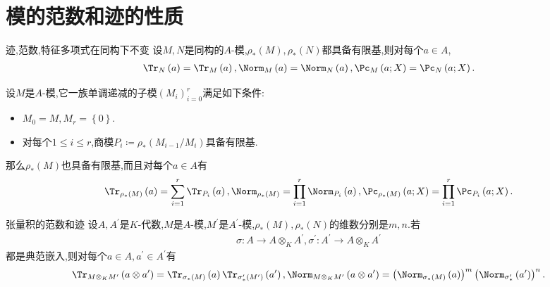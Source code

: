 \section{模的范数和迹的性质}

\begin{proposition}{迹,范数,特征多项式在同构下不变}{}
	设$M,N$是同构的$A$-模,$\rho_{\ast}\left(M\right),\rho_{\ast}\left(N\right)$都具备有限基,则对每个$a\in A$,
	\begin{align*}
		\Tr_{N}\left(a\right)=\Tr_{M}\left(a\right),\Norm_{M}\left(a\right)=\Norm_{N}\left(a\right),\Pc_{M}\left(a;X\right)=\Pc_{N}\left(a;X\right).
	\end{align*}
\end{proposition}

\begin{proposition}{}{}
	设$M$是$A$-模,它一族单调递减的子模$\left(M_{i}\right)_{i=0}^{r}$满足如下条件:
	\begin{itemize}
		\item $M_{0}=M,M_{r}=\left\{0\right\}$.
		\item 对每个$1\leq i\leq r$,商模$P_{i}\coloneq\rho_{\ast}\left(M_{i-1}/M_{i}\right)$具备有限基.
	\end{itemize}
	那么$\rho_{\ast}\left(M\right)$也具备有限基,而且对每个$a\in A$有
	\begin{align*}
		\Tr_{\rho_{\ast}\left(M\right)}\left(a\right)=\sum\limits_{i=1}^{r}\Tr_{P_{i}}\left(a\right),\Norm_{\rho_{\ast}\left(M\right)}=\prod\limits_{i=1}^{r}\Norm_{P_{i}}\left(a\right),\Pc_{\rho_{\ast}\left(M\right)}\left(a;X\right)=\prod\limits_{i=1}^{r}\Pc_{P_{i}}\left(a;X\right).
	\end{align*}
\end{proposition}

\begin{proposition}{张量积的范数和迹}{}
	设$A,A^{\prime}$是$K$-代数,$M$是$A$-模,$M^{\prime}$是$A^{\prime}$-模,$\rho_{\ast}\left(M\right),\rho_{\ast}\left(N\right)$的维数分别是$m,n$.若
	\begin{align*}
		\sigma:A\to A\otimes_{K}A^{\prime},\sigma^{\prime}:A^{\prime}\to A\otimes_{K}A^{\prime}
	\end{align*}
	都是典范嵌入,则对每个$a\in A,a^{\prime}\in A^{\prime}$有
	\begin{align*}
		\Tr_{M\otimes_{K}M^{\prime}}\left(a\otimes a^{\prime}\right)=\Tr_{\sigma_{\ast}\left(M\right)}\left(a\right)\Tr_{\sigma_{\ast}^{\prime}\left(M^{\prime}\right)}\left(a^{\prime}\right),
		\Norm_{M\otimes_{K}M^{\prime}}\left(a\otimes a^{\prime}\right)=\left(\Norm_{\sigma_{\ast}\left(M\right)}\left(a\right)\right)^{m}\left(\Norm_{\sigma_{\ast}^{\prime}}\left(a^{\prime}\right)\right)^{n}.
	\end{align*}
\end{proposition}























